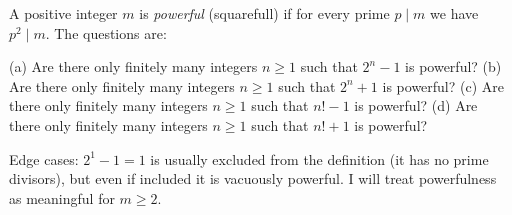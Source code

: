 A positive integer \(m\) is \emph{powerful} (squarefull) if for every prime \(p\mid m\) we have \(p^2\mid m\).
The questions are:

(a) Are there only finitely many integers \(n\ge 1\) such that \(2^n-1\) is powerful?
(b) Are there only finitely many integers \(n\ge 1\) such that \(2^n+1\) is powerful?
(c) Are there only finitely many integers \(n\ge 1\) such that \(n!-1\) is powerful?
(d) Are there only finitely many integers \(n\ge 1\) such that \(n!+1\) is powerful?

Edge cases: \(2^1-1=1\) is usually excluded from the definition (it has no prime divisors), but even if included it is vacuously powerful. I will treat powerfulness as meaningful for \(m\ge 2\).
